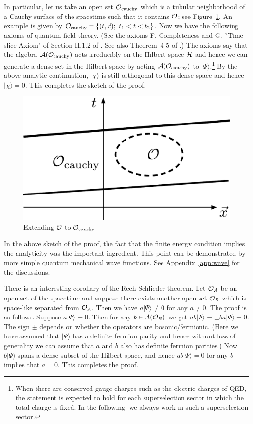 \documentclass[a4paper,11pt]{article}
\theoremstyle{plain}
\theoremstyle{definition}
\numberwithin{thm}{section}
\newcommand{\ket}[1]{ | {#1} \rangle }
\def\CA{{\cal A}}
\def\CH{{\cal H}}
\def\CO{{\cal O}}
\begin{document}
In particular, let us take an open set $\CO_{\rm cauchy}$ which is a tubular neighborhood of a Cauchy surface of the spacetime
such that it contains $\CO$; see Figure~\ref{fig:cauchy}. 
An example is given by $\CO_{\rm cauchy}=\{ (t, \vec{x});~ t_1 < t <t_2 \}$.
Now we have the following axioms of quantum field theory. 
(See the axioms F. Completeness and G. ``Time-slice Axiom" of Section II.1.2 of \cite{Haag:1992hx}. See also
Theorem~4-5 of \cite{Streater:1989vi}.)
The axioms say that the algebra $\CA(\CO_{\rm cauchy})$ acts irreducibly on the Hilbert space $\CH$ and hence we can generate a dense set
in the Hilbert space by acting $\CA(\CO_{\rm cauchy})$ to $\ket{\Psi}$.\footnote{When there are conserved gauge charges such as the electric charges of QED,
the statement is expected to hold for each superselection sector in which the total charge is fixed. In the following, we always work in such
a superselection sector.}
By the above analytic continuation,
$\ket{\chi}$ is still orthogonal to this dense space and hence $\ket{\chi}=0$. This completes the sketch of the proof.
\begin{figure}
\centering
\includegraphics[width=.35\textwidth]{cauchy}
\caption{Extending $\CO$ to $\CO_{\rm cauchy}$ \label{fig:cauchy}}
\end{figure}

In the above sketch of the proof, the fact that the finite energy condition implies the analyticity was the important ingredient.
This point can be demonstrated by more simple quantum mechanical wave functions. See Appendix~\ref{app:wave} for the discussions.


There is an interesting corollary of the Reeh-Schlieder theorem.
Let $\CO_A$ be an open set of the spacetime and suppose there exists another open set $\CO_B$ which is space-like separated from $\CO_A$.
Then we have $a\ket{\Psi} \neq 0$ for any $a \neq 0$. The proof is as follows. Suppose $a\ket{\Psi}=0$. Then for any $b \in \CA(\CO_B)$
we get $ab\ket{\Psi}=\pm ba\ket{\Psi} = 0$. The sign $ \pm$ depends on whether the operators are bosonic/fermionic.
(Here we have assumed that $\ket{\Psi}$ has a definite fermion parity and hence without loss of generality we can assume that $a$ and $b$
also has definite fermion parities.) Now $b\ket{\Psi}$ spans a dense subset of the Hilbert space, and hence $ab\ket{\Psi}=0$ for any $b$
implies that $a=0$. This completes the proof.
\end{document}

